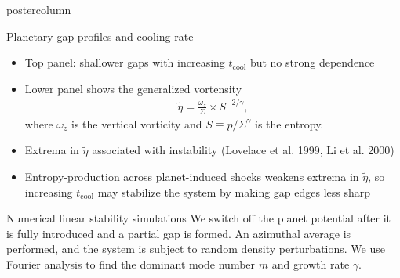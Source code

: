 \documentclass[final,hyperref={pdfpagelabels=false}]{beamer}
\begin{document}
\begin{frame}
\begin{columns}
\begin{column}{.49\textwidth}
\begin{beamercolorbox}[center,wd=\textwidth]{postercolumn}
\begin{minipage}[T]{.95\textwidth}
{\begin{block}{{\Large Planetary gap profiles and cooling
              rate}}
\begin{minipage}[t]{0.49\textwidth}
\begin{figure}
            \end{figure}
          \end{minipage}
          \begin{minipage}[t]{0.49\textwidth}
            \begin{itemize}
            \item Top panel: shallower gaps with increasing $t_\mathrm{cool}$ 
              but no strong dependence 
            \item Lower panel shows the generalized vortensity
              \begin{align*}
                \tilde{\eta} = \frac{\omega_z}{\Sigma}\times S^{-2/\gamma},
              \end{align*}
              where $\omega_z$ is the vertical vorticity and $S\equiv
              p/\Sigma^\gamma$ is the entropy. 
            \item Extrema in $\tilde{\eta}$ associated with
              instability (Lovelace et al. 1999, Li et al. 2000)
            \item Entropy-production across planet-induced shocks
              weakens extrema in $\tilde{\eta}$, so
             increasing $t_\mathrm{cool}$ may stabilize the
              system by making gap edges less sharp
            \end{itemize}
          \end{minipage}
        \end{block}
        \vfill
        \begin{block}{{\Large Numerical linear stability simulations}}
          \justifying
          We switch off the planet potential after it is fully
          introduced and a partial gap is formed. An azimuthal
          average is performed, and the system is subject to random
          density perturbations. We use Fourier analysis to find
          the dominant mode number $m$ and growth rate $\gamma$.  
          \\   
          \vspace{-2cm}

\end{block}}
\end{minipage}
\end{beamercolorbox}
\end{column}
\end{columns}
\end{frame}
\end{document}
